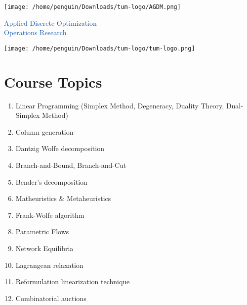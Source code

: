 \documentclass{article}
\begin{document}
\begin{center}
    \begin{minipage}{0.15\textwidth}
        \texttt{[image: /home/penguin/Downloads/tum-logo/AGDM.png]} 
    \end{minipage}
    \hfill
    \begin{minipage}{0.55\textwidth}
        \centering
        \textcolor[HTML]{165DB1}{\LARGE Applied Discrete Optimization} \\[1ex]
        \textcolor[HTML]{165DB1}{\LARGE Operations Research} \\[1ex]
    \end{minipage}
    \hfill
    \begin{minipage}{0.15\textwidth}
        \texttt{[image: /home/penguin/Downloads/tum-logo/tum-logo.png]} 
    \end{minipage}
\end{center}
\noindent
\large 
\vspace{5mm}
\normalsize
\section*{Course Topics}
\begin{enumerate}
    \item Linear Programming (Simplex Method, Degeneracy, Duality Theory, Dual-Simplex Method)
    \item Column generation 
    \item Dantzig Wolfe decomposition
    \item Branch-and-Bound, Branch-and-Cut
    \item Bender's decomposition
    \item Matheuristics \& Metaheuristics
    \item Frank-Wolfe algorithm
    \item Parametric Flows
    \item Network Equilibria
    \item Lagrangean relaxation
    \item Reformulation linearization technique
    \item Combinatorial auctions
\end{enumerate}
\end{document}
